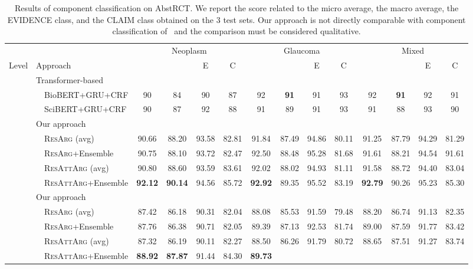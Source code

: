 \documentclass[journal]{IEEEtran}
\begin{document}
\begin{table*}[t]
\centering
 \caption[Results of component classification on AbstRCT.]{Results of component classification on AbstRCT. We report the  score related to the micro average, the macro average, the EVIDENCE class, and the CLAIM class obtained on the 3 test sets. Our approach is not directly comparable with component classification of~\cite{DBLP:conf/ecai/0002CV20} and the comparison must be considered qualitative.}
 \label{table:resnets_resultsRCTCC}
 \begin{tabular}{l l cccc cccc cccc}
 \noalign{\smallskip}
 \hline
 \noalign{\smallskip}
 & & \multicolumn{4}{c}{Neoplasm} & \multicolumn{4}{c}{Glaucoma}  & \multicolumn{4}{c}{Mixed} \\
 \noalign{\smallskip}

 Level & Approach    &		&	 	&   E    &    C	 &	 	&	 	&   E    &    C	 &	 	&	 	&   E    &    C	\\
 \noalign{\smallskip}
 \hline
 \noalign{\smallskip}
\multirow{8}{*}{Token} & Transformer-based~\cite{DBLP:conf/ecai/0002CV20}    &	&		&		&		&		&		\\			
& ~~BioBERT+GRU+CRF	&	90	&	84  &  90 & 87	&	92	&	\textbf{91}  & 91  &	93 &	92	&	\textbf{91}  & 92  &	91 \\
& ~~SciBERT+GRU+CRF	&	90	&	87  & 92  & 88	&	91	&	89  & 91  & 93	&	91	&	88  &  93 & 90	\\
\noalign{\smallskip}
& Our approach    &	&		&		&		&		&		\\			
& ~~\textsc{ResArg} (avg) & 90.66 & 88.20 & 93.58 & 82.81 & 91.84 & 87.49 & 94.86 & 80.11 & 91.25 & 87.79 & 94.29 & 81.29 \\
& ~~\textsc{ResArg}+Ensemble &  90.75 & 88.10 & 93.72 & 82.47 & 92.50 & 88.48 & 95.28 & 81.68 & 91.61 & 88.21 & 94.54 & 91.61\\
& ~~\textsc{ResAttArg} (avg) & 90.80 & 88.60 & 93.59 & 83.61 & 92.02 & 88.02 & 94.93 & 81.11 & 91.58 & 88.72 & 94.40 & 83.04 \\
& ~~\textsc{ResAttArg}+Ensemble	&	\textbf{92.12}	&	\textbf{90.14}	&	94.56	&	85.72	&	\textbf{92.92}	&	89.35	&	95.52	&	83.19	&	\textbf{92.79}	&	90.26	&	95.23	&	85.30	\\

 \noalign{\smallskip}
 \hline
 \noalign{\smallskip}

\multirow{5}{*}{Component} & Our approach    &	&		&		&		&		&		\\
& ~~\textsc{ResArg} (avg) & 87.42 & 86.18 & 90.31 & 82.04 & 88.08 & 85.53 & 91.59 & 79.48 & 88.20 & 86.74 & 91.13 & 82.35\\
& ~~\textsc{ResArg}+Ensemble & 87.76 & 86.38 & 90.71 & 82.05 & 89.39 & 87.13 & 92.53 & 81.74 & 89.00 & 87.59 & 91.77 & 83.42 \\
& ~~\textsc{ResAttArg} (avg) & 87.32 & 86.19 & 90.11 & 82.27 & 88.50 & 86.26 & 91.79 & 80.72 & 88.65 & 87.51 & 91.27 & 83.74  \\
& ~~\textsc{ResAttArg}+Ensemble& \textbf{88.92}
	&	\textbf{87.87}	&   91.44	&	84.30	& \textbf{89.73}


\end{tabular}
\end{table*}
\end{document}
